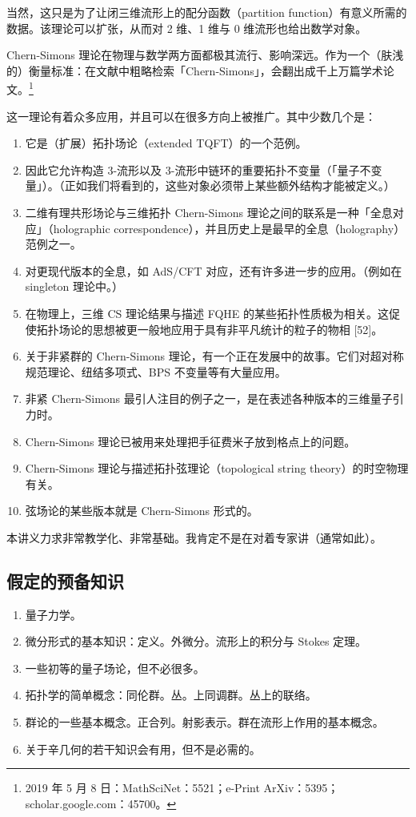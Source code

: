 当然，这只是为了让闭三维流形上的配分函数（partition function）有意义所需的数据。该理论可以扩张，从而对 2 维、1 维与 0 维流形也给出数学对象。

Chern-Simons 理论在物理与数学两方面都极其流行、影响深远。作为一个（肤浅的）衡量标准：在文献中粗略检索「Chern-Simons」，会翻出成千上万篇学术论文。\footnote{2019 年 5 月 8 日：MathSciNet：5521；e-Print ArXiv：5395；scholar.google.com：45700。}

这一理论有着众多应用，并且可以在很多方向上被推广。其中少数几个是：

\begin{enumerate}
  \item 它是（扩展）拓扑场论（extended TQFT）的一个范例。
  \item 因此它允许构造 3-流形以及 3-流形中链环的重要拓扑不变量（「量子不变量」）。（正如我们将看到的，这些对象必须带上某些额外结构才能被定义。）
  \item 二维有理共形场论与三维拓扑 Chern-Simons 理论之间的联系是一种「全息对应」（holographic correspondence），并且历史上是最早的全息（holography）范例之一。
  \item 对更现代版本的全息，如 AdS/CFT 对应，还有许多进一步的应用。（例如在 singleton 理论中。）
  \item 在物理上，三维 CS 理论结果与描述 FQHE 的某些拓扑性质极为相关。这促使拓扑场论的思想被更一般地应用于具有非平凡统计的粒子的物相 [52]。
  \item 关于非紧群的 Chern-Simons 理论，有一个正在发展中的故事。它们对超对称规范理论、纽结多项式、BPS 不变量等有大量应用。
  \item 非紧 Chern-Simons 最引人注目的例子之一，是在表述各种版本的三维量子引力时。
  \item Chern-Simons 理论已被用来处理把手征费米子放到格点上的问题。
  \item Chern-Simons 理论与描述拓扑弦理论（topological string theory）的时空物理有关。
  \item 弦场论的某些版本就是 Chern-Simons 形式的。
\end{enumerate}

本讲义力求非常教学化、非常基础。我肯定不是在对着专家讲（通常如此）。

\subsection{假定的预备知识} %

\begin{enumerate}
  \item 量子力学。
  \item 微分形式的基本知识：定义。外微分。流形上的积分与 Stokes 定理。
  \item 一些初等的量子场论，但不必很多。
  \item 拓扑学的简单概念：同伦群。丛。上同调群。丛上的联络。
  \item 群论的一些基本概念。正合列。射影表示。群在流形上作用的基本概念。
  \item 关于辛几何的若干知识会有用，但不是必需的。
\end{enumerate}

